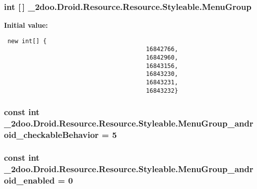 \hypertarget{class__2doo_1_1_droid_1_1_resource_1_1_styleable_44406f23b082b60311bda958f0f142a9}{
\subsubsection[{MenuGroup}]{\setlength{\rightskip}{0pt plus 5cm}int \mbox{[}$\,$\mbox{]} \_\-2doo.Droid.Resource.Resource.Styleable.MenuGroup}}
\label{class__2doo_1_1_droid_1_1_resource_1_1_styleable_44406f23b082b60311bda958f0f142a9}


\textbf{Initial value:}

\begin{Code}\begin{verbatim} new int[] {
                                        16842766,
                                        16842960,
                                        16843156,
                                        16843230,
                                        16843231,
                                        16843232}
\end{verbatim}
\end{Code}
\hypertarget{class__2doo_1_1_droid_1_1_resource_1_1_styleable_90914b6d547956ccf2c4982ce5c9ad66}{
\subsubsection[{MenuGroup\_\-android\_\-checkableBehavior}]{\setlength{\rightskip}{0pt plus 5cm}const int \_\-2doo.Droid.Resource.Resource.Styleable.MenuGroup\_\-android\_\-checkableBehavior = 5}}
\label{class__2doo_1_1_droid_1_1_resource_1_1_styleable_90914b6d547956ccf2c4982ce5c9ad66}


\hypertarget{class__2doo_1_1_droid_1_1_resource_1_1_styleable_e55810ee34c1d6dc611b730ef6b43ad1}{
\subsubsection[{MenuGroup\_\-android\_\-enabled}]{\setlength{\rightskip}{0pt plus 5cm}const int \_\-2doo.Droid.Resource.Resource.Styleable.MenuGroup\_\-android\_\-enabled = 0}}
\label{class__2doo_1_1_droid_1_1_resource_1_1_styleable_e55810ee34c1d6dc611b730ef6b43ad1}


